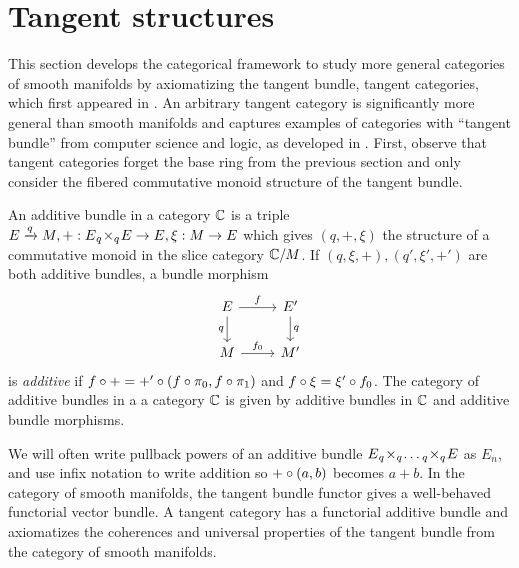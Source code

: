 \section{Tangent structures}%
\label{sec:tangent-structure}
This section develops the categorical framework to study more general categories of smooth manifolds by axiomatizing the tangent bundle, tangent categories, which first appeared in \cite{Rosicky1984}. An arbitrary tangent category is significantly more general than smooth manifolds and captures examples of categories with ``tangent bundle'' from computer science and logic, as developed in \cite{Cockett2014}. First, observe that tangent categories forget the base ring from the previous section and only consider the fibered commutative monoid structure of the tangent bundle.
\begin{definition}\label{def:add-bun}
    An additive bundle in a category $\mathbb{C}$ is a triple $E \xrightarrow{q} M, +:E{_{q}}\!\times_{q}\!E \to E, \xi:M \to E$ which gives $(q,+,\xi)$ the structure of a commutative monoid in the slice category $\mathbb{C}/M$.
    If $(q,\xi,+), (q',\xi',+')$ are both additive bundles, a bundle morphism
    \[
        \begin{tikzcd}
            E \dar[swap]{q} \rar{f} & E' \dar{q} \\
            M \rar{f_0} & M'
        \end{tikzcd}
    \]
    is \textit{additive} if $f \circ + = +' \circ (f\circ \pi_0,f\circ \pi_1)$ and $f \circ \xi = \xi' \circ f_0$. The category of additive bundles in a a category $\mathbb{C}$ is given by additive bundles in $\mathbb{C}$ and additive bundle morphisms.
\end{definition}
We will often write pullback powers of an additive bundle $E {_{q}}\!\times_{q}\! \dots {_{q}}\!\times_{q}\! E$ as $E_n$, and use infix notation to write addition so $+ \circ (a,b)$ becomes $a + b$.
In the category of smooth manifolds, the tangent bundle functor gives a well-behaved functorial vector bundle. 
A tangent category has a functorial additive bundle and axiomatizes the coherences and universal properties of the tangent bundle from the category of smooth manifolds.
